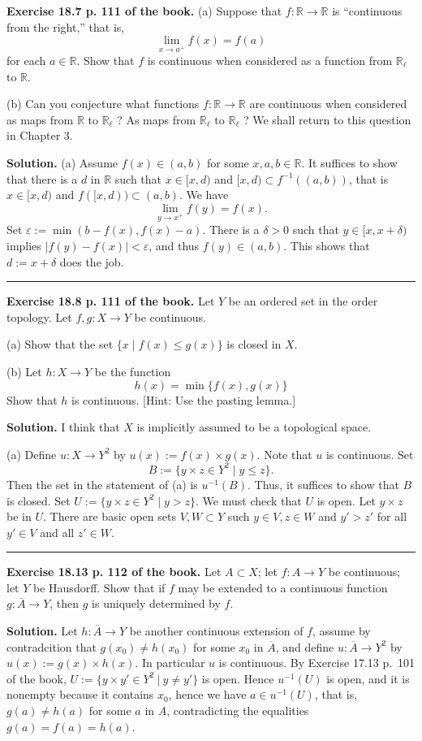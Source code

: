 \documentclass[12pt,letterpaper]{article}
\newcommand{\hs}{\bigskip\hrule\medskip}
\newcommand{\noi}{\noindent}%
\newcommand{\R}{\mathbb R}
\begin{document}
\noi\textbf{Exercise 18.7 p. 111 of the book.} (a) Suppose that $f: \mathbb{R} \rightarrow \mathbb{R}$ is ``continuous from the right,'' that is,
\[
\lim _{x \rightarrow a^{+}} f(x)=f(a)
\]
for each $a \in \mathbb{R}$. Show that $f$ is continuous when considered as a function from $\mathbb{R}_{\ell}$ to $\mathbb{R}$.

\noi(b) Can you conjecture what functions $f: \mathbb{R} \rightarrow \mathbb{R}$ are continuous when considered as maps from $\mathbb{R}$ to $\mathbb{R}_{\ell}$ ? As maps from $\mathbb{R}_{\ell}$ to $\mathbb{R}_{\ell}$ ? We shall return to this question in Chapter 3.

\noi\textbf{Solution.} (a) Assume $f(x)\in(a,b)$ for some $x,a,b\in\R$. It suffices to show that there is a $d$ in $\R$ such that $x\in[x,d)$ and $[x,d)\subset f^{-1}((a,b))$, that is $x\in[x,d)$ and $f([x,d))\subset(a,b)$. We have 
\[
\lim _{y\rightarrow x^{+}}f(y)=f(x).
\] 
Set $\varepsilon:=\min(b-f(x),f(x)-a)$. There is a $\delta>0$ such that $y\in[x,x+\delta)$ implies $|f(y)-f(x)|<\varepsilon$, and thus $f(y)\in(a,b)$. This shows that $d:=x+\delta$ does the job. 

\hs 

\noi\textbf{Exercise 18.8 p. 111 of the book.} Let $Y$ be an ordered set in the order topology. Let $f, g: X \rightarrow Y$ be continuous.

\noindent (a) Show that the set $\{x \mid f(x) \leq g(x)\}$ is closed in $X$.

\noindent (b) Let $h:X\rightarrow Y$ be the function
$$
h(x)=\min \{f(x), g(x)\}
$$
Show that $h$ is continuous. [Hint: Use the pasting lemma.]

\noi\textbf{Solution.} I think that $X$ is implicitly assumed to be a topological space. 

\noi(a) Define $u:X\to Y^2$ by $u(x):=f(x)\times g(x)$. Note that $u$ is continuous. Set 
$$
B:=\{y\times z\in Y^2\mid y\le z\}.
$$ 
Then the set in the statement of (a) is $u^{-1}(B)$. Thus, it suffices to show that $B$ is closed. Set $U:=\{y\times z\in Y^2\mid y>z\}$. We must check that $U$ is open. Let $y\times z$ be in $U$. There are basic open sets $V,W\subset Y$ such $y\in V,z\in W$ and $y'>z'$ for all $y'\in V$ and all $z'\in W$. 

\hs

\noi\textbf{Exercise 18.13 p. 112 of the book.} Let $A\subset X$; let $f:A\to Y$ be continuous; let $Y$ be Hausdorff. Show that if $f$ may be extended to a continuous function $g:\overline A\to Y$, then $g$ is uniquely determined by $f$. 

\noi\textbf{Solution.} Let $h:\overline A\to Y$ be another continuous extension of $f$, assume by contradcition that $g(x_0)\ne h(x_0)$ for some $x_0$ in $\overline A$, and define $u:\overline A\to Y^2$ by $u(x):=g(x)\times h(x)$. In particular $u$ is continuous. By Exercise 17.13 p.~101 of the book, $U:=\{y\times y'\in Y^2\ |\ y\ne y'\}$ is open. Hence $u^{-1}(U)$ is open, and it is nonempty because it contains $x_0$, hence we have $a\in u^{-1}(U)$, that is, $g(a)\ne h(a)$ for some $a$ in $A$, contradicting the equalities $g(a)=f(a)=h(a)$. 
\end{document}
